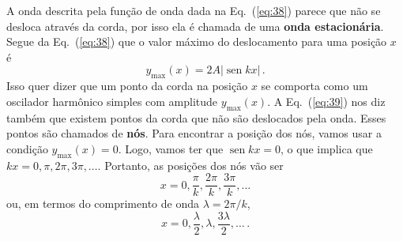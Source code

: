 \documentclass[twocolumn=on,fontsize=12pt,DIV=calc]{scrartcl}
\theoremstyle{definition}
\DeclareMathOperator{\sen}{sen}
\begin{document}
A onda descrita pela função de onda dada na Eq.~(\ref{eq:38}) parece
que não se desloca através da corda, por isso ela é chamada de uma
\textbf{onda estacionária}. Segue da Eq.~(\ref{eq:38}) que o valor
máximo do deslocamento para uma posição $x$ é
\begin{equation}
  \label{eq:39}
  y_\mathrm{max}(x)=2A|\sen kx|\,.
\end{equation}
Isso quer dizer que um ponto da corda na posição $x$ se comporta como
um oscilador harmônico simples com amplitude $y_\mathrm{max}(x)$. A
Eq.~(\ref{eq:39}) nos diz também que existem pontos da corda que não
são deslocados pela onda. Esses pontos são chamados de
\textbf{nós}. Para encontrar a posição dos nós, vamos usar a condição
$y_\mathrm{max}(x)=0$. Logo, vamos ter que $\sen kx=0$, o que implica
que $kx=0,\pi,2\pi,3\pi,\ldots$. Portanto, as posições dos nós vão ser
$$x=0,\frac{\pi}{k},\frac{2\pi}{k},\frac{3\pi}{k},\ldots$$
ou, em termos do comprimento de onda $\lambda=2\pi/k$,
$$x=0,\frac{\lambda}{2},\lambda,\frac{3\lambda}{2},\ldots\,.$$
\end{document}

